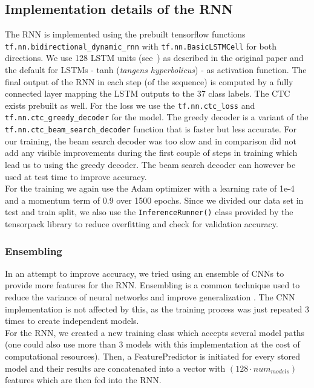 \documentclass{utue} %
\begin{document}
\subsection{Implementation details of the RNN}
The RNN is implemented using the prebuilt tensorflow functions \texttt{tf.nn.bidirectional\_dynamic\_rnn} with \texttt{tf.nn.BasicLSTMCell} for both directions. We use 128 LSTM units (see~\cite{lstmpaper}) as described in the original paper and the default for LSTMs - tanh (\textit{tangens hyperbolicus}) - as activation function. The final output of the RNN in each step (of the sequence) is computed by a fully connected layer mapping the LSTM outputs to the 37 class labels.
The CTC exists prebuilt as well. For the loss we use the \texttt{tf.nn.ctc\_loss} and \texttt{tf.nn.ctc\_greedy\_decoder} for the model. The greedy decoder is a variant of the \texttt{tf.nn.ctc\_beam\_search\_decoder} function that is faster but less accurate. For our training, the beam search decoder was too slow and in comparison did not add any visible improvements during the first couple of steps in training which lead us to using the greedy decoder. The beam search decoder can however be used at test time to improve accuracy.\\
For the training we again use the Adam optimizer with a learning rate of 1e-4 and a momentum term of 0.9 over 1500 epochs. Since we divided our data set in test and train split, we also use the \texttt{InferenceRunner()} class provided by the tensorpack library to reduce overfitting and check for validation accuracy. 

\subsubsection{Ensembling}
In an attempt to improve accuracy, we tried using an ensemble of CNNs to provide more features for the RNN. Ensembling is a common technique used to reduce the variance of neural networks and improve generalization \cite{ensembles}. The CNN implementation is not affected by this, as the training process was just repeated 3 times to create independent models.\\
For the RNN, we created a new training class which accepts several model paths (one could also use more than 3 models with this implementation at the cost of computational resources). Then, a FeaturePredictor is initiated for every stored model and their results are concatenated into a vector with $(128\cdot num_{models})$ features which are then fed into the RNN.
\end{document}

